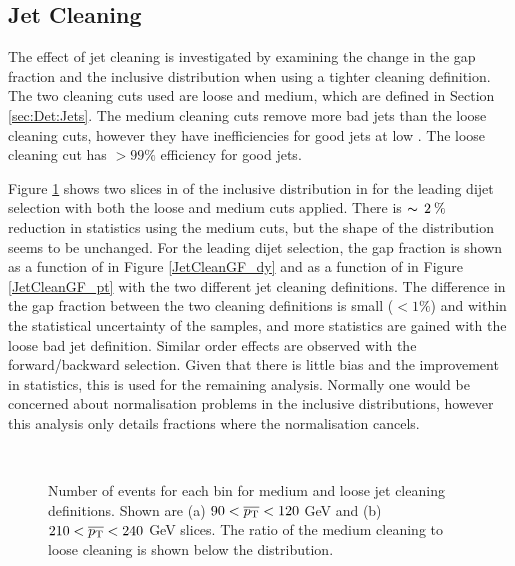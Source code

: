 \subsection{Jet Cleaning}
\label{sec:GBJ1:Cleaning}

The effect of jet cleaning is investigated by examining the change in the gap fraction and the inclusive distribution when using a tighter cleaning definition. 
The two cleaning cuts used are loose and medium, which are defined in Section \ref{sec:Det:Jets}.
The medium cleaning cuts remove more bad jets than the loose cleaning cuts, however they have inefficiencies for good jets at low \pt{}.
The loose cleaning cut has $>99\%$ efficiency for good jets.

Figure \ref{JetCleanIncl_dy} shows two slices in \ptb{} of the inclusive distribution in \dy{} for the leading \pt{} dijet selection with both the loose and medium cuts applied. 
There is $\thicksim\, 2\: \%\: $ reduction in statistics using the medium cuts, but the shape of the distribution seems to be unchanged.  
For the leading \pt{} dijet selection, the gap fraction is shown as a function of \ptb{} in Figure \ref{JetCleanGF_dy} and as a function of \dy{} in Figure \ref{JetCleanGF_pt} with the two different jet cleaning definitions. 
The difference in the gap fraction between the two cleaning definitions is small ($<1\%$) and within the statistical uncertainty of the samples, and more statistics are gained with the loose bad jet definition.
Similar order effects are observed with the forward/backward selection.
Given that there is little bias and the improvement in statistics, this is used for the remaining analysis. 
Normally one would be concerned about normalisation problems in the inclusive distributions, however this analysis only details fractions where the normalisation cancels.


\begin{figure}
\centering
\mbox{
              \quad
              \quad
                              }
\caption[Effect of jet cleaning on the inclusive distribution in \dy{}]{
Number of events for each \dy{} bin for medium and loose jet cleaning definitions. 
Shown are (a) $90<\mbox{$\overline{p_{\rm T}}$}{}<120$ GeV and (b)$210<\mbox{$\overline{p_{\rm T}}$}{}<240$ GeV slices.
The ratio of the medium cleaning to loose cleaning is shown below the distribution.
\label{JetCleanIncl_dy}}
\end{figure}

